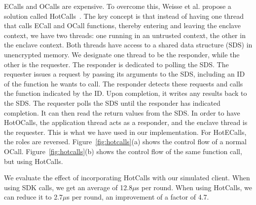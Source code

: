  ECalls and OCalls are expensive. To overcome this, Weisse et al. propose a solution called HotCalls~\cite{weisse2017regaining}. The key concept is that instead of having one thread that calls ECall and OCall functions, thereby entering and leaving the enclave context, we have two threads: one running in an untrusted context, the other in the enclave context. Both threads have access to a shared data structure (SDS) in unencrypted memory. We designate one thread to be the responder, while the other is the requester. The responder is dedicated to polling the SDS. The requester issues a request by passing its arguments to the SDS, including an ID of the function he wants to call. The responder detects these requests and calls the function indicated by the ID. Upon completion, it writes any results back to the SDS. The requester polls the SDS until the responder has indicated completion. It can then read the return values from the SDS. In order to have HotOCalls, the application thread acts as a responder, and the enclave thread is the requester. This is what we have used in our implementation. For HotECalls, the roles are reversed. Figure~\ref{fig:hotcalls}(a) shows the control flow of a normal OCall. Figure~\ref{fig:hotcalls}(b) shows the control flow of the same function call, but using HotCalls.

We evaluate the effect of incorporating HotCalls with our simulated client. When using SDK calls, we get an average of 12.8$\mu$s per round. When using HotCalls, we can reduce it to 2.7$\mu$s per round, an improvement of a factor of 4.7.